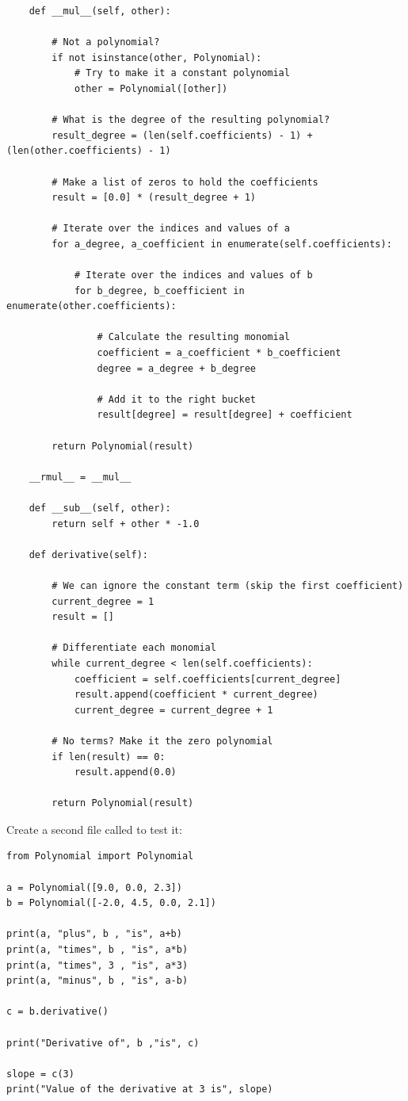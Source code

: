 \begin{verbatim}
    def __mul__(self, other):

        # Not a polynomial?
        if not isinstance(other, Polynomial):
            # Try to make it a constant polynomial
            other = Polynomial([other])
        
        # What is the degree of the resulting polynomial?
        result_degree = (len(self.coefficients) - 1) + (len(other.coefficients) - 1)

        # Make a list of zeros to hold the coefficients
        result = [0.0] * (result_degree + 1)

        # Iterate over the indices and values of a
        for a_degree, a_coefficient in enumerate(self.coefficients):

            # Iterate over the indices and values of b
            for b_degree, b_coefficient in enumerate(other.coefficients):

                # Calculate the resulting monomial
                coefficient = a_coefficient * b_coefficient
                degree = a_degree + b_degree
            
                # Add it to the right bucket
                result[degree] = result[degree] + coefficient
            
        return Polynomial(result)

    __rmul__ = __mul__

    def __sub__(self, other):
        return self + other * -1.0
    
    def derivative(self):

        # We can ignore the constant term (skip the first coefficient)
        current_degree = 1
        result = []

        # Differentiate each monomial
        while current_degree < len(self.coefficients):
            coefficient = self.coefficients[current_degree]
            result.append(coefficient * current_degree)
            current_degree = current_degree + 1

        # No terms? Make it the zero polynomial
        if len(result) == 0:
            result.append(0.0)

        return Polynomial(result)
\end{verbatim}

Create a second file called  to test it:
\begin{verbatim}
from Polynomial import Polynomial

a = Polynomial([9.0, 0.0, 2.3])
b = Polynomial([-2.0, 4.5, 0.0, 2.1])

print(a, "plus", b , "is", a+b)
print(a, "times", b , "is", a*b)
print(a, "times", 3 , "is", a*3)
print(a, "minus", b , "is", a-b)

c = b.derivative()

print("Derivative of", b ,"is", c)

slope = c(3)
print("Value of the derivative at 3 is", slope)

\end{verbatim}

